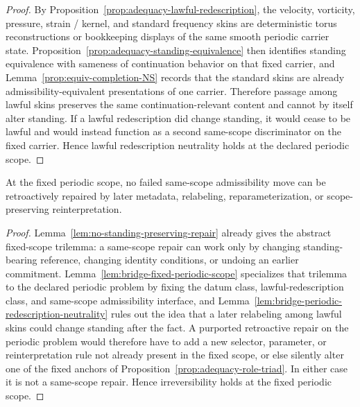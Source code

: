 \begin{proof}
By Proposition~\ref{prop:adequacy-lawful-redescription}, the velocity, vorticity, pressure, strain / kernel, and standard frequency skins are deterministic torus reconstructions or bookkeeping displays of the same smooth periodic carrier state. Proposition~\ref{prop:adequacy-standing-equivalence} then identifies standing equivalence with sameness of continuation behavior on that fixed carrier, and Lemma~\ref{prop:equiv-completion-NS} records that the standard skins are already admissibility-equivalent presentations of one carrier. Therefore passage among lawful skins preserves the same continuation-relevant content and cannot by itself alter standing. If a lawful redescription did change standing, it would cease to be lawful and would instead function as a second same-scope discriminator on the fixed carrier. Hence lawful redescription neutrality holds at the declared periodic scope.
\end{proof}

\begin{manuallemma}
\label{lem:bridge-periodic-irreversibility}
At the fixed periodic scope, no failed same-scope admissibility move can be retroactively repaired by later metadata, relabeling, reparameterization, or scope-preserving reinterpretation.
\end{manuallemma}

\begin{proof}
Lemma~\ref{lem:no-standing-preserving-repair} already gives the abstract fixed-scope trilemma: a same-scope repair can work only by changing standing-bearing reference, changing identity conditions, or undoing an earlier commitment. Lemma~\ref{lem:bridge-fixed-periodic-scope} specializes that trilemma to the declared periodic problem by fixing the datum class, lawful-redescription class, and same-scope admissibility interface, and Lemma~\ref{lem:bridge-periodic-redescription-neutrality} rules out the idea that a later relabeling among lawful skins could change standing after the fact. A purported retroactive repair on the periodic problem would therefore have to add a new selector, parameter, or reinterpretation rule not already present in the fixed scope, or else silently alter one of the fixed anchors of Proposition~\ref{prop:adequacy-role-triad}. In either case it is not a same-scope repair. Hence irreversibility holds at the fixed periodic scope.
\end{proof}

